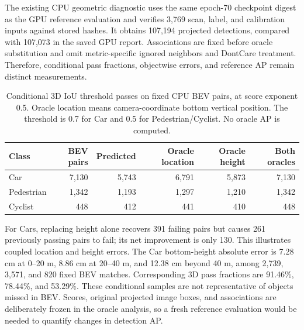 \documentclass[10pt]{article}
\begin{document}
The existing CPU geometric diagnostic uses the same epoch-70 checkpoint digest as the GPU reference evaluation and verifies 3,769 scan, label, and calibration inputs against stored hashes. It obtains 107,194 projected detections, compared with 107,073 in the saved GPU report. Associations are fixed before oracle substitution and omit metric-specific ignored neighbors and DontCare treatment. Therefore, conditional pass fractions, objectwise errors, and reference AP remain distinct measurements.

\begin{table}[htbp]
\centering\small
\caption{Conditional 3D IoU threshold passes on fixed CPU BEV pairs, at score exponent 0.5. Oracle location means camera-coordinate bottom vertical position. The threshold is 0.7 for Car and 0.5 for Pedestrian/Cyclist. No oracle AP is computed.}
\begin{tabular}{lrrrrr}
\toprule Class & BEV pairs & Predicted & Oracle location & Oracle height & Both oracles \\
\midrule
Car & 7,130 & 5,743 & 6,791 & 5,873 & 7,130 \\
Pedestrian & 1,342 & 1,193 & 1,297 & 1,210 & 1,342 \\
Cyclist & 448 & 412 & 441 & 410 & 448 \\
\bottomrule
\end{tabular}
\end{table}

For Cars, replacing height alone recovers 391 failing pairs but causes 261 previously passing pairs to fail; its net improvement is only 130. This illustrates coupled location and height errors. The Car bottom-height absolute error is 7.28 cm at 0--20 m, 8.86 cm at 20--40 m, and 12.38 cm beyond 40 m, among 2,739, 3,571, and 820 fixed BEV matches. Corresponding 3D pass fractions are 91.46\%, 78.44\%, and 53.29\%. These conditional samples are not representative of objects missed in BEV. Scores, original projected image boxes, and associations are deliberately frozen in the oracle analysis, so a fresh reference evaluation would be needed to quantify changes in detection AP.

\clearpage


\end{document}
